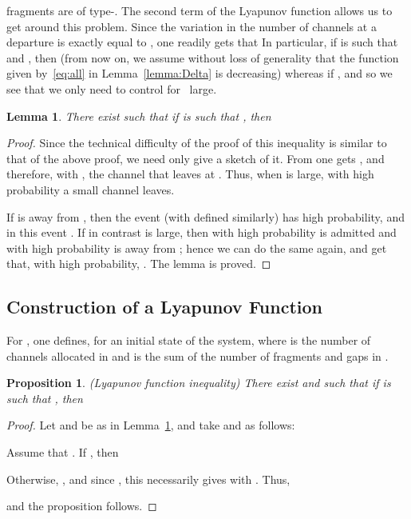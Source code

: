 \documentclass{amsart}
\newtheorem{lemma}{Lemma}
\newtheorem{proposition}{Proposition}
\begin{document}
fragments are of type-. The second term of the Lyapunov function
allows us to get around this  problem.  Since  the  variation
  in  the number  of  channels at  a departure is
exactly equal to , one readily gets that
 In particular,  if   is such that
  and , then  (from now  on,  we assume  without loss  of
generality that the function   given by~\eqref{eq:all} in Lemma~\ref{lemma:Delta} is
decreasing)
 whereas if ,
 and so we see
that we only need to control  for~ large.
\begin{lemma} \label{lemma:ell}
There exist  such that if  is such that , then
 
\end{lemma}
\begin{proof}
Since the technical difficulty of the proof of this inequality is
similar to that of the above proof, we need only give a sketch of
it. From  one gets , and therefore,  with ,  the channel that leaves at . Thus, when  is large,
with high probability a small channel leaves.


If  is away from , then the event   (with  defined  similarly) has  high probability,  and in  this event  . If in contrast  is large,  then with high probability 
is admitted and with high probability  is away from ; hence we can do
the  same again,  and get  that, with  high probability,  . The lemma is proved.
\end{proof}

\subsection*{Construction of a Lyapunov Function}
For , one defines, for an initial state  of the system,
 where
  is the number of channels allocated in  and  is
the sum of the number of fragments and gaps in .
\begin{proposition} {\em (Lyapunov function inequality)} \label{prop:lyapunov}
There exist  and  such that if  is such
that , then

\end{proposition}
\begin{proof}
   Let  and  be as in Lemma~\ref{lemma:ell}, and take
     and  as follows:


Assume that . If , then
    
Otherwise, , and since , this
necessarily gives  with
. Thus,
    
and the proposition follows.
\end{proof}
\end{document}
